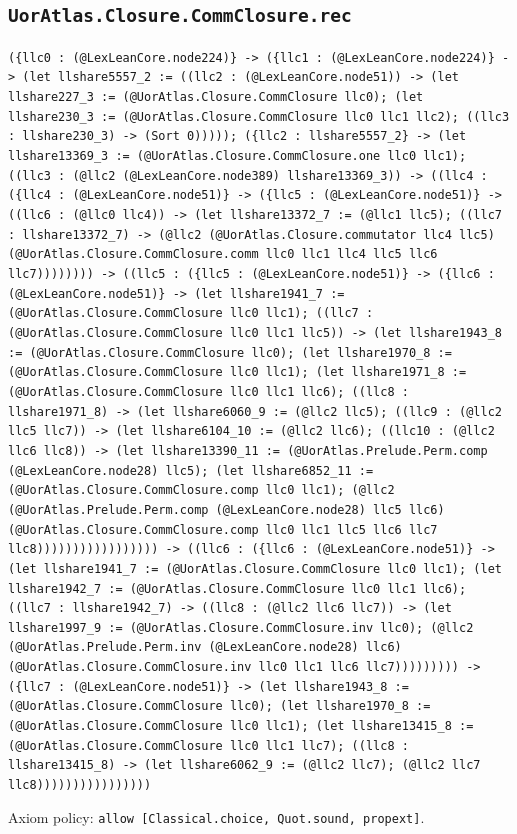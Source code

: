 \documentclass[11pt]{article}
\begin{document}
\subsection*{\texttt{UorAtlas.Closure.CommClosure.rec}}
\noindent\texttt{(\{llc0 : (@LexLeanCore.node224)\} -> (\{llc1 : (@LexLeanCore.node224)\} -> (let llshare5557\_2 := ((llc2 : (@LexLeanCore.node51)) -> (let llshare227\_3 := (@UorAtlas.Closure.CommClosure llc0); (let llshare230\_3 := (@UorAtlas.Closure.CommClosure llc0 llc1 llc2); ((llc3 : llshare230\_3) -> (Sort 0))))); (\{llc2 : llshare5557\_2\} -> (let llshare13369\_3 := (@UorAtlas.Closure.CommClosure.one llc0 llc1); ((llc3 : (@llc2 (@LexLeanCore.node389) llshare13369\_3)) -> ((llc4 : (\{llc4 : (@LexLeanCore.node51)\} -> (\{llc5 : (@LexLeanCore.node51)\} -> ((llc6 : (@llc0 llc4)) -> (let llshare13372\_7 := (@llc1 llc5); ((llc7 : llshare13372\_7) -> (@llc2 (@UorAtlas.Closure.commutator llc4 llc5) (@UorAtlas.Closure.CommClosure.comm llc0 llc1 llc4 llc5 llc6 llc7)))))))) -> ((llc5 : (\{llc5 : (@LexLeanCore.node51)\} -> (\{llc6 : (@LexLeanCore.node51)\} -> (let llshare1941\_7 := (@UorAtlas.Closure.CommClosure llc0 llc1); ((llc7 : (@UorAtlas.Closure.CommClosure llc0 llc1 llc5)) -> (let llshare1943\_8 := (@UorAtlas.Closure.CommClosure llc0); (let llshare1970\_8 := (@UorAtlas.Closure.CommClosure llc0 llc1); (let llshare1971\_8 := (@UorAtlas.Closure.CommClosure llc0 llc1 llc6); ((llc8 : llshare1971\_8) -> (let llshare6060\_9 := (@llc2 llc5); ((llc9 : (@llc2 llc5 llc7)) -> (let llshare6104\_10 := (@llc2 llc6); ((llc10 : (@llc2 llc6 llc8)) -> (let llshare13390\_11 := (@UorAtlas.Prelude.Perm.comp (@LexLeanCore.node28) llc5); (let llshare6852\_11 := (@UorAtlas.Closure.CommClosure.comp llc0 llc1); (@llc2 (@UorAtlas.Prelude.Perm.comp (@LexLeanCore.node28) llc5 llc6) (@UorAtlas.Closure.CommClosure.comp llc0 llc1 llc5 llc6 llc7 llc8))))))))))))))))) -> ((llc6 : (\{llc6 : (@LexLeanCore.node51)\} -> (let llshare1941\_7 := (@UorAtlas.Closure.CommClosure llc0 llc1); (let llshare1942\_7 := (@UorAtlas.Closure.CommClosure llc0 llc1 llc6); ((llc7 : llshare1942\_7) -> ((llc8 : (@llc2 llc6 llc7)) -> (let llshare1997\_9 := (@UorAtlas.Closure.CommClosure.inv llc0); (@llc2 (@UorAtlas.Prelude.Perm.inv (@LexLeanCore.node28) llc6) (@UorAtlas.Closure.CommClosure.inv llc0 llc1 llc6 llc7))))))))) -> (\{llc7 : (@LexLeanCore.node51)\} -> (let llshare1943\_8 := (@UorAtlas.Closure.CommClosure llc0); (let llshare1970\_8 := (@UorAtlas.Closure.CommClosure llc0 llc1); (let llshare13415\_8 := (@UorAtlas.Closure.CommClosure llc0 llc1 llc7); ((llc8 : llshare13415\_8) -> (let llshare6062\_9 := (@llc2 llc7); (@llc2 llc7 llc8))))))))))))))))}\par
\noindent Axiom policy: \texttt{allow [Classical.choice, Quot.sound, propext]}.\par
\end{document}
